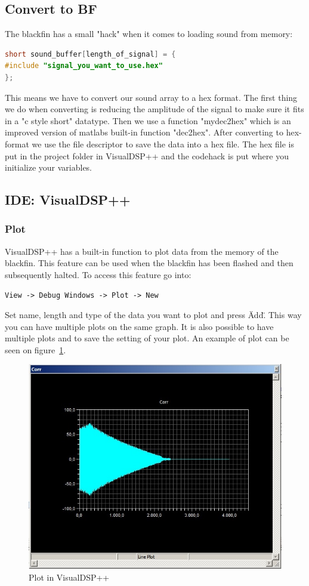 \subsection{Convert to BF}
The blackfin has a small "hack" when it comes to loading sound from memory:
\begin{lstlisting}[language=C]
short sound_buffer[length_of_signal] = { 
#include "signal_you_want_to_use.hex"
};
\end{lstlisting}
This means we have to convert our sound array to a hex format. The first thing we do when converting is reducing the amplitude of the signal to make sure it fits in a "c style short" datatype. Then we use a function "mydec2hex" which is an improved version of matlabs built-in function "dec2hex". After converting to hex-format we use the file descriptor to save the data into a hex file. The hex file is put in the project folder in VisualDSP++ and the codehack is put where you initialize your variables.



\subsection{IDE: VisualDSP++}
\subsubsection{Plot}
VisualDSP++ has a built-in function to plot data from the memory of the blackfin. This feature can be used when the blackfin has been flashed and then subsequently halted. To access this feature go into:
\begin{verbatim}
View -> Debug Windows -> Plot -> New
\end{verbatim}
Set name, length and type of the data you want to plot and press \"Add\". This way you can have multiple plots on the same graph. It is also possible to have multiple plots and to save the setting of your plot. An example of plot can be seen on figure~\ref{fig:visualdspplot}.
\begin{figure}[hbpt]
\centering
\includegraphics[scale=0.5]{billeder/visualdspplot}
\caption{Plot in VisualDSP++}
\label{fig:visualdspplot}
\end{figure}
